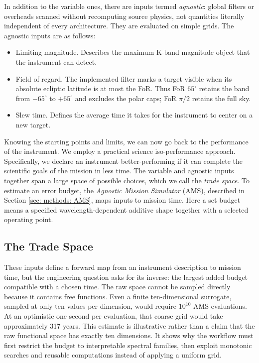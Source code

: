 \documentclass[12pt,a4paper]{article}
\numberwithin{equation}{section}
\numberwithin{figure}{section}
\numberwithin{table}{section}
\begin{document}
In addition to the variable ones, there are inputs termed \textit{agnostic}: global filters or overheads scanned without recomputing source physics, not quantities literally independent of every architecture. They are evaluated on simple grids. The agnostic inputs are as follows:
\begin{itemize}
    \item Limiting magnitude. Describes the maximum K-band magnitude object that the instrument can detect.
    \item Field of regard. The implemented filter marks a target visible when its absolute ecliptic latitude is at most the FoR. Thus FoR $65^\circ$ retains the band from $-65^\circ$ to $+65^\circ$ and excludes the polar caps; FoR $\pi/2$ retains the full sky.
    \item Slew time. Defines the average time it takes for the instrument to center on a new target.
\end{itemize}
Knowing the starting points and limits, we can now go back to the performance of the instrument. We employ a practical science iso-performance approach. Specifically, we declare an instrument better-performing if it can complete the scientific goals of the mission in less time. The variable and agnostic inputs together span a large space of possible choices, which we call the \textit{trade space}. To estimate an error budget, the \textit{Agnostic Mission Simulator} (AMS), described in Section \ref{sec: methods: AMS}, maps inputs to mission time. Here a set budget means a specified wavelength-dependent additive shape together with a selected operating point.

\subsection{The Trade Space} \label{sec: intro: trade space}
These inputs define a forward map from an instrument description to mission time, but the engineering question asks for its inverse: the largest added budget compatible with a chosen time. The raw space cannot be sampled directly because it contains free functions. Even a finite ten-dimensional surrogate, sampled at only ten values per dimension, would require $10^{10}$ AMS evaluations. At an optimistic one second per evaluation, that coarse grid would take approximately 317 years. This estimate is illustrative rather than a claim that the raw functional space has exactly ten dimensions. It shows why the workflow must first restrict the budget to interpretable spectral families, then exploit monotonic searches and reusable computations instead of applying a uniform grid.
\end{document}
